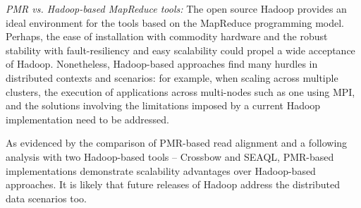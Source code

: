 \documentclass{acm_proc_article-sp}
\begin{document}
\textit{PMR vs. Hadoop-based MapReduce tools: }The open source Hadoop
provides an ideal environment for the tools based on the MapReduce
programming model.  Perhaps, the ease of installation with commodity
hardware and the robust stability with fault-resiliency and easy
scalability could propel a wide acceptance of Hadoop.  Nonetheless,
Hadoop-based approaches find many hurdles in distributed contexts and
scenarios: for example, when scaling across multiple
clusters\cite{weissman-mr-11}, the execution of applications across
multi-nodes such as one using MPI, and the solutions involving the
limitations imposed by a current Hadoop implementation need to be
addressed.


As evidenced by the comparison of PMR-based read alignment and a
following analysis with two Hadoop-based tools -- Crossbow and SEAQL,
PMR-based implementations demonstrate scalability advantages over
Hadoop-based approaches. It is likely that future releases of Hadoop
address the distributed data scenarios too.

%
\end{document}
